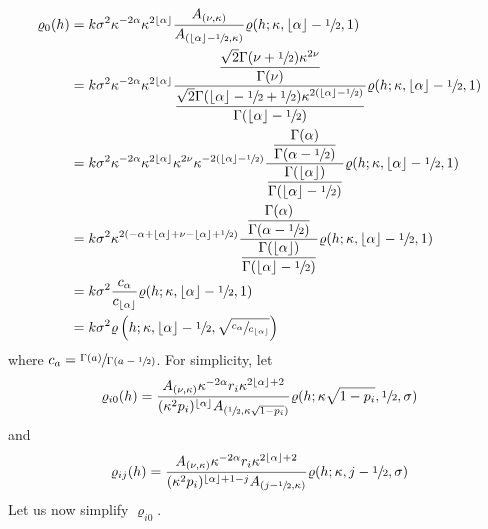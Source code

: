 \documentclass[11pt,a4paper]{article}
\theoremstyle{plain}
\theoremstyle{definition}
\begin{document}
\begin{align*}
    \varrho_0(h) &= k\sigma^2\kappa^{-2\alpha}\kappa^{2\lfloor\alpha\rfloor}\dfrac{A_{(\nu,\kappa)}}{A_{(\lfloor\alpha\rfloor-\sfrac{1}{2},\kappa)}}\varrho(h;\kappa, \lfloor\alpha\rfloor-\sfrac{1}{2}, 1)\\
    &= k\sigma^2\kappa^{-2\alpha}\kappa^{2\lfloor\alpha\rfloor}\dfrac{\dfrac{\sqrt{2}\Gamma(\nu+\sfrac{1}{2})\kappa^{2\nu}}{\Gamma(\nu)}}{\dfrac{\sqrt{2}\Gamma(\lfloor\alpha\rfloor-\sfrac{1}{2}+\sfrac{1}{2})\kappa^{2(\lfloor\alpha\rfloor-\sfrac{1}{2})}}{\Gamma(\lfloor\alpha\rfloor-\sfrac{1}{2})}}\varrho(h;\kappa, \lfloor\alpha\rfloor-\sfrac{1}{2}, 1)\\
    &= k\sigma^2\kappa^{-2\alpha}\kappa^{2\lfloor\alpha\rfloor}\kappa^{2\nu}\kappa^{-2(\lfloor\alpha\rfloor-\sfrac{1}{2})}\dfrac{\dfrac{\Gamma(\alpha)}{\Gamma(\alpha-\sfrac{1}{2})}}{\dfrac{\Gamma(\lfloor\alpha\rfloor)}{\Gamma(\lfloor\alpha\rfloor-\sfrac{1}{2})}}\varrho(h;\kappa, \lfloor\alpha\rfloor-\sfrac{1}{2}, 1)\\
    &= k\sigma^2\kappa^{2(-\alpha+\lfloor\alpha\rfloor+\nu-\lfloor\alpha\rfloor+\sfrac{1}{2})}\dfrac{\dfrac{\Gamma(\alpha)}{\Gamma(\alpha-\sfrac{1}{2})}}{\dfrac{\Gamma(\lfloor\alpha\rfloor)}{\Gamma(\lfloor\alpha\rfloor-\sfrac{1}{2})}}\varrho(h;\kappa, \lfloor\alpha\rfloor-\sfrac{1}{2}, 1)\\
    &= k\sigma^2\dfrac{c_\alpha}{c_{\lfloor\alpha\rfloor}}\varrho(h;\kappa, \lfloor\alpha\rfloor-\sfrac{1}{2}, 1)\\
    &= k\sigma^2\varrho\left(h;\kappa, \lfloor\alpha\rfloor-\sfrac{1}{2}, \sqrt{\sfrac{c_\alpha}{c_{\lfloor\alpha\rfloor}}}\right)
\end{align*}
where $c_a = \sfrac{\Gamma(a)}{\Gamma(a-\sfrac{1}{2})}$. 
For simplicity, let
\begin{align}
    \varrho_{i0}(h) = \dfrac{A_{(\nu,\kappa)}\kappa^{-2\alpha}r_i\kappa^{2\lfloor\alpha\rfloor+2}}{(\kappa^{2}p_i)^{\lfloor\alpha\rfloor}A_{(\sfrac{1}{2},\kappa\sqrt{1-p_i})}}\varrho(h;\kappa\sqrt{1-p_i}, \sfrac{1}{2}, \sigma)
\end{align}
and 
\begin{align}
    \varrho_{ij}(h) = \dfrac{A_{(\nu,\kappa)}\kappa^{-2\alpha}r_i\kappa^{2\lfloor\alpha\rfloor+2}}{(\kappa^{2}p_i)^{\lfloor\alpha\rfloor+1-j}A_{(j-\sfrac{1}{2},\kappa)}}\varrho(h;\kappa, j-\sfrac{1}{2}, \sigma)
\end{align}
Let us now simplify $\varrho_{i0}$.
\end{document}
